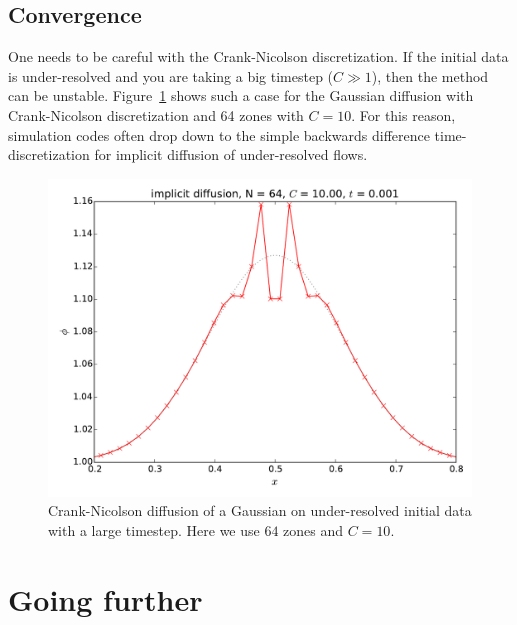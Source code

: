 \subsection{Convergence}

One needs to be careful with the Crank-Nicolson discretization.  If
the initial data is under-resolved and you are taking a big timestep
($C \gg 1$), then the method can be unstable.
Figure~\ref{fig:diff:cnunstable} shows such a case for the Gaussian
diffusion with Crank-Nicolson discretization and 64 zones with $C =
10$.  For this reason, simulation codes often drop down to the
simple backwards difference time-discretization for implicit diffusion
of under-resolved flows.

\begin{figure}
\centering
\includegraphics[width=\linewidth]{diff-implicit-64-CFL_10_0}
\caption[Under-resolved Crank-Nicolson diffusion]
{\label{fig:diff:cnunstable} Crank-Nicolson diffusion of a Gaussian
on under-resolved initial data with a large timestep.  Here we use
$64$ zones and $C= 10$.}
\end{figure}

\section{Going further}

